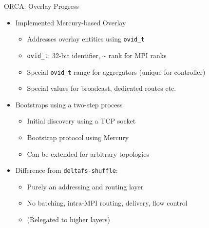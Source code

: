 \documentclass[
  ignorenonframetext,
]{beamer}
\providecommand{\tightlist}{%
  \setlength{\itemsep}{0pt}\setlength{\parskip}{0pt}}\usepackage{longtable,booktabs,array}
\begin{document}
\begin{frame}[fragile]{ORCA: Overlay Progress}
\label{orca-overlay-progress}
\begin{itemize}
\tightlist
\item
  Implemented Mercury-based Overlay

  \begin{itemize}
  \tightlist
  \item
    Addresses overlay entities using \texttt{ovid\_t}
  \item
    \texttt{ovid\_t}: 32-bit identifier, \textasciitilde{} rank for MPI
    ranks
  \item
    Special \texttt{ovid\_t} range for aggregators (unique for
    controller)
  \item
    Special values for broadcast, dedicated routes etc.
  \end{itemize}
\end{itemize}

\pause

\begin{itemize}
\tightlist
\item
  Bootstraps using a two-step process

  \begin{itemize}
  \tightlist
  \item
    Initial discovery using a TCP socket
  \item
    Bootstrap protocol using Mercury
  \item
    Can be extended for arbitrary topologies
  \end{itemize}
\end{itemize}

\pause

\begin{itemize}
\tightlist
\item
  Difference from \texttt{deltafs-shuffle}:

  \begin{itemize}
  \tightlist
  \item
    Purely an addressing and routing layer
  \item
    No batching, intra-MPI routing, delivery, flow control
  \item
    (Relegated to higher layers)
  \end{itemize}
\end{itemize}
\end{frame}
\end{document}
